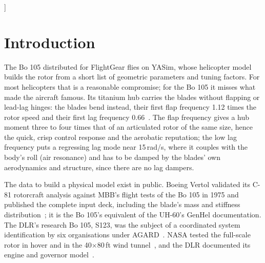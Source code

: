 \documentclass[10pt,a4paper,twocolumn]{article}
\begin{document}
\begin{@twocolumnfalse}
\begin{abstract}
full-scale rotor's measured decay (\NLagMod{} against \NLagTest\,s$^{-1}$ at $C_T/\sigma=\NLagCt$). At 80\,kt the roll response to lateral
cyclic is within \NFmagRms\,dB (rms) of DLR's identified transfer function from 1 to 12\,rad/s, including the lag/air resonance near 15\,rad/s,
and the rate responses to the four AGARD verification doublets have a mean on-axis rms error of \NDbOnDeg\,deg/s. Deficiencies are
quantified: the isolated rotor in hover needs \NHcpMin--\NHcpMax\,\% less power than the full-scale test at the same thrust and
\NHthMin--\NHthMax$^\circ$ less collective, the tail rotor's pitch is \NTrBeTransMin--\NTrBeTransMax$^\circ$ above DLR's through
the transition from 20 to 40\,kt and \NTrBeHover$^\circ$ from it in the hover, several cross-coupling derivatives at 80\,kt lie outside the spread of six identifications from the same flights, the pitch and roll
damping derivatives are larger than any of them, and in the longitudinal and collective doublets the free model drifts away from the
aircraft after about ten seconds.
\end{abstract}
\vspace{6pt}
\end{@twocolumnfalse}
]

\section{Introduction}
The Bo 105 distributed for FlightGear flies on YASim, whose helicopter model builds the rotor from a short list of geometric
parameters and tuning factors. For most helicopters that is a reasonable compromise; for the Bo 105 it misses what made
the aircraft famous. Its titanium hub carries the blades without flapping or lead-lag hinges: the blades bend instead,
their first flap frequency 1.12 times the rotor speed and their first lag frequency 0.66~\cite{pt}. The flap frequency gives a
hub moment three to four times that of an articulated rotor of the same size, hence the quick, crisp control response and
the aerobatic reputation; the low lag frequency puts a regressing lag mode near 15\,rad/s, where it couples with the body's
roll (air resonance) and has to be damped by the blades' own aerodynamics and structure, since there are no lag dampers.

The data to build a physical model exist in public. Boeing Vertol validated its C-81 rotorcraft analysis against MBB's
flight tests of the Bo 105 in 1975 and published the complete input deck, including the blade's mass and stiffness
distribution~\cite{tr}; it is the Bo 105's equivalent of the UH-60's GenHel documentation. The DLR's research Bo 105, S123,
was the subject of a coordinated system identification by six organisations under AGARD~\cite{ar,kal}. NASA tested the
full-scale rotor in hover and in the 40$\times$80\,ft wind tunnel~\cite{pw,wp,pt,pm}, and the DLR documented its engine and
governor model~\cite{hg}.
\end{document}

